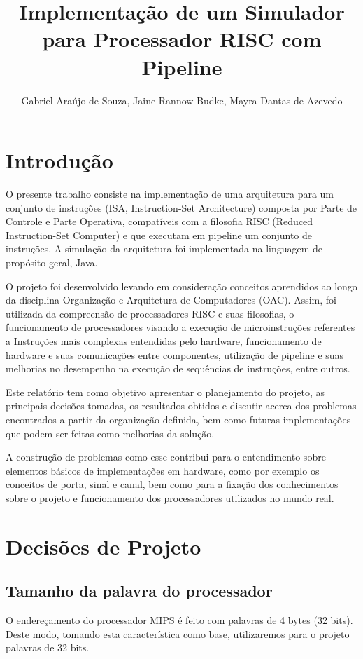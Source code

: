 \documentclass[12pt]{article}
\title{Implementação de um Simulador para Processador RISC com Pipeline}
\author{Gabriel Araújo de Souza\inst{1}, Jaine Rannow Budke\inst{2}, Mayra Dantas de Azevedo\inst{3} }
\begin{document}
 

\maketitle

\section{Introdução}
O presente trabalho consiste na implementação de uma arquitetura para um conjunto de instruções (ISA, Instruction-Set Architecture) composta por Parte de Controle e Parte Operativa, compatíveis com a filosofia RISC (Reduced Instruction-Set Computer) e que executam em pipeline um conjunto de instruções. A simulação da arquitetura foi implementada na linguagem de propósito geral, Java.

O projeto foi desenvolvido levando em consideração conceitos aprendidos ao longo da disciplina Organização e Arquitetura de Computadores (OAC). Assim, foi utilizada da compreensão de processadores RISC e suas filosofias, o funcionamento de processadores visando a execução de microinstruções referentes a Instruções mais complexas entendidas pelo hardware, funcionamento de hardware e suas comunicações entre componentes, utilização de pipeline e suas melhorias no desempenho na execução de sequências de instruções, entre outros.

Este relatório tem como objetivo apresentar o planejamento do projeto, as principais decisões tomadas, os resultados obtidos e discutir acerca dos problemas encontrados a partir da organização definida, bem como futuras implementações que podem ser feitas como melhorias da solução.

A construção de problemas como esse contribui para o entendimento sobre elementos básicos de implementações em hardware, como por exemplo os conceitos de porta, sinal e canal, bem como para a fixação dos conhecimentos sobre o projeto e funcionamento dos processadores utilizados no mundo real.

\section{Decisões de Projeto}

\subsection{Tamanho da palavra do processador}

O endereçamento do processador MIPS é feito com palavras de 4 bytes (32 bits). Deste modo, tomando esta característica como base, utilizaremos para o projeto palavras de 32 bits.
\end{document}

